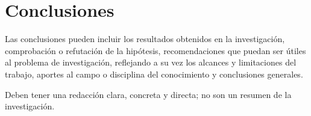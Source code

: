 \chapter*{Conclusiones}

Las conclusiones pueden incluir los resultados obtenidos en la investigación, comprobación o refutación de la hipótesis, recomendaciones que puedan ser útiles al problema de investigación, reflejando a su vez los alcances y limitaciones del trabajo, aportes al campo o disciplina del conocimiento y conclusiones generales.

Deben tener una redacción clara, concreta y directa; no son un resumen de la investigación.